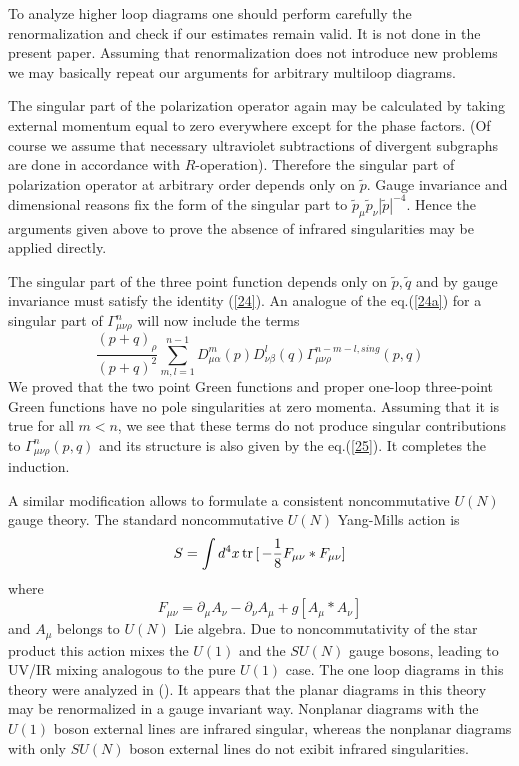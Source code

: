 \documentclass[a4paper,12pt]{article}
\newcommand{\tr}[1]{\,{\rm tr}\,#1\,}
\begin{document}
To analyze higher loop diagrams one should perform carefully the
renormalization and check if our estimates remain valid. It is not done 
in the present paper. Assuming that renormalization does not introduce new 
problems we may basically repeat our arguments for arbitrary multiloop 
diagrams.

 The singular part of the polarization operator again may be 
calculated by taking external momentum equal to zero everywhere except for 
the phase factors.  (Of course we assume that necessary ultraviolet 
subtractions of divergent subgraphs are done in accordance with 
$R$-operation). Therefore the singular part of polarization operator at 
arbitrary order depends only on $\tilde{p}$.  Gauge invariance and 
dimensional reasons fix the form of the singular part to $\tilde{p}_{\mu} 
\tilde{p}_{\nu}|\tilde{p}|^{-4}$.  Hence the arguments given above to 
prove the absence of infrared singularities may be applied directly.

The singular part of the three point function depends only on $\tilde{p}, 
 \tilde{q}$ and by gauge invariance must satisfy the identity (\ref{24}). 
An analogue of the eq.(\ref{24a}) for a singular part of $\Gamma^n 
_{\mu \nu \rho}$ will now include the terms
\begin{equation} 
\frac{(p+q)_{\rho}}{(p+q)^2} \sum_{m,l=1}^{n-1}D_{\mu \alpha}^m(p)D_{\nu 
\beta}^l(q) \Gamma_{\mu \nu \rho}^{n-m-l, sing}(p,q) 
 \label{26} 
 \end{equation} 
  We proved that the two point Green functions and proper 
one-loop three-point Green functions have no pole singularities at zero 
momenta.  Assuming that it is true for 
all $m<n$, we see that these terms do not produce singular contributions 
to $\Gamma^n_{\mu \nu \rho}(p,q)$ and its structure is also given by the 
eq.(\ref{25}). It completes the induction.

A similar modification allows to formulate a consistent noncommutative 
 $U(N)$ gauge theory. The standard noncommutative $U(N)$ Yang-Mills action 
is
\begin{equation}
S=\int d^4x \tr[- \frac{1}{8}F_{\mu \nu}*F_{\mu \nu}]
  \label{28} 
 \end{equation} 
 where
 \begin{equation} 
F_{\mu \nu}= \partial_{\mu}A_{\nu}- 
 \partial_{\nu}A_{\mu}+g[A_{\mu}*A_{\nu}]
 \label{29} 
 \end{equation} 
 and $A_{\mu}$ belongs to $U(N)$ Lie algebra. Due to noncommutativity of 
the star product this action mixes the $U(1)$ and the $SU(N)$ gauge 
bosons, leading to UV/IR mixing analogous to the pure $U(1)$ case. The one 
loop diagrams in this theory were analyzed in (\cite{AA}). It 
appears that the planar diagrams in this theory may be 
renormalized in a gauge invariant way. Nonplanar 
diagrams with the $U(1)$ boson external lines are infrared 
singular, whereas the nonplanar diagrams with only $SU(N)$ 
boson external lines do not exibit infrared singularities.
\end{document}
